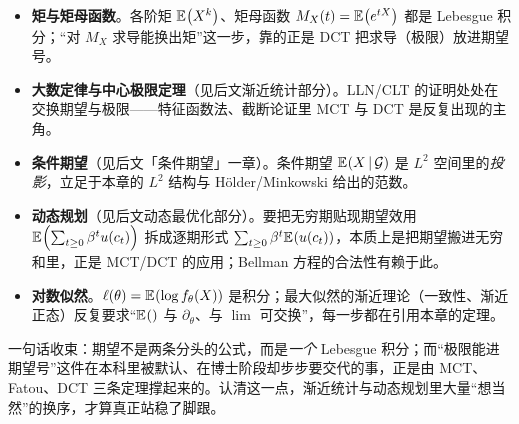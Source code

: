 \begin{itemize}
    \item \textbf{矩与矩母函数}。各阶矩 $\mathbb{E}_{}\!\left(X^k\right)$、矩母函数 $M_X(t)=\mathbb{E}_{}\!\left(e^{tX}\right)$ 都是 Lebesgue 积分；``对 $M_X$ 求导能换出矩''这一步，靠的正是 DCT 把求导（极限）放进期望号。
    \item \textbf{大数定律与中心极限定理}（见后文渐近统计部分）。LLN/CLT 的证明处处在交换期望与极限——特征函数法、截断论证里 MCT 与 DCT 是反复出现的主角。
    \item \textbf{条件期望}（见后文「条件期望」一章）。条件期望 $\mathbb{E}_{}\!\left(X\,\middle|\,\mathcal{G}\right)$ 是 $L^2$ 空间里的\emph{投影}，立足于本章的 $L^2$ 结构与 H\"older/Minkowski 给出的范数。
    \item \textbf{动态规划}（见后文动态最优化部分）。要把无穷期贴现期望效用 $\mathbb{E}_{}\!\left(\sum_{t\ge0}\beta^t u(c_t)\right)$ 拆成逐期形式 $\sum_{t\ge0}\beta^t\mathbb{E}_{}\!\left(u(c_t)\right)$，本质上是把期望搬进无穷和里，正是 MCT/DCT 的应用；Bellman 方程的合法性有赖于此。
    \item \textbf{对数似然}。$\ell(\theta)=\mathbb{E}_{}\!\left(\log f_\theta(X)\right)$ 是积分；最大似然的渐近理论（一致性、渐近正态）反复要求``$\mathbb{E}_{}\!\left(\right)$ 与 $\partial_\theta$、与 $\lim$ 可交换''，每一步都在引用本章的定理。
\end{itemize}

一句话收束：期望不是两条分头的公式，而是\emph{一个} Lebesgue 积分；而``极限能进期望号''这件在本科里被默认、在博士阶段却步步要交代的事，正是由 MCT、Fatou、DCT 三条定理撑起来的。认清这一点，渐近统计与动态规划里大量``想当然''的换序，才算真正站稳了脚跟。
